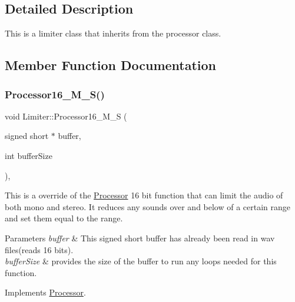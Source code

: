\subsection{Detailed Description}
This is a limiter class that inherits from the processor class. 

\subsection{Member Function Documentation}
\mbox{\label{classLimiter_ab81f92ad3d76078c424c2f4a8f518ba9}} 
\subsubsection{\texorpdfstring{Processor16\+\_\+\+M\+\_\+\+S()}{Processor16\_M\_S()}}
{\footnotesize\ttfamily void Limiter\+::\+Processor16\+\_\+\+M\+\_\+S (\begin{DoxyParamCaption}\item[{signed short $\ast$}]{buffer,  }\item[{int}]{buffer\+Size }\end{DoxyParamCaption})\hspace{0.3cm}{\ttfamily [override]}, {\ttfamily [virtual]}}



This is a override of the \hyperlink{classProcessor}{Processor} 16 bit function that can limit the audio of both mono and stereo. It reduces any sounds over and below of a certain range and set them equal to the range. 


\begin{DoxyParams}{Parameters}
{\em buffer} & This signed short buffer has already been read in wav files(reads 16 bits). \\
\hline
{\em buffer\+Size} & provides the size of the buffer to run any loops needed for this function. \\
\hline
\end{DoxyParams}


Implements \hyperlink{classProcessor}{Processor}.

\mbox{\label{classLimiter_acc021d4c3af04a48b8af7bb8853ce654}} 
